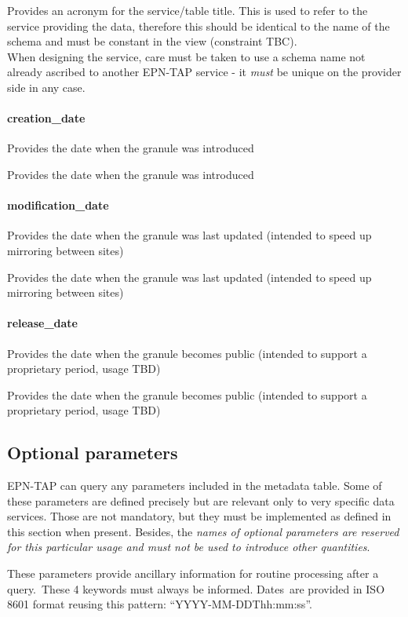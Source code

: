 \documentclass[11pt,a4paper]{ivoa}
\begin{document}
Provides an acronym for the service/table title. This is used to refer to the service providing the data, therefore this should be identical to the name of the schema and must be constant in the view (constraint TBC).\\When designing the service, care must be taken to use a schema name not already ascribed to another EPN-TAP service - it \emph{must} be unique on the provider side in any case.

\paragraph{creation\_date}

Provides the date when the granule was introduced

Provides the date when the granule was introduced

\paragraph{modification\_date}

Provides the date when the granule was last updated (intended to speed up mirroring between sites)

Provides the date when the granule was last updated (intended to speed up mirroring between sites)

\paragraph{release\_date}

Provides the date when the granule becomes public (intended to support a proprietary period, usage TBD)

Provides the date when the granule becomes public (intended to support a proprietary period, usage TBD)

\subsection{Optional parameters}

EPN-TAP can query any parameters included in the metadata table. Some of these parameters are defined precisely but are relevant only to very specific data services. Those are not mandatory, but they must be implemented as defined in this section when present. Besides, the\emph{ names of optional parameters are reserved for this particular usage and must not be used to introduce other quantities}. 

These parameters provide ancillary information for routine processing after a query. These 4 keywords must always be informed. Dates are provided in ISO 8601 format reusing this pattern: “YYYY-MM-DDThh:mm:ss”. 
\end{document}
